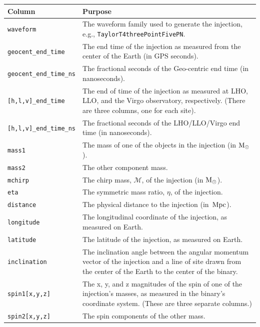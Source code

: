 \begin{table}[p]
\label{tab:sim_inspiral}
\center
\begin{tabular}{l | p{10cm}}
Column      &   Purpose     \\
\hline \hline
\texttt{waveform}    &   The waveform family used to generate the injection, e.g., \texttt{TaylorT4threePointFivePN}. \\
\hline
\texttt{geocent\_end\_time}     &   The end time of the injection as measured from the center of the Earth (in GPS seconds). \\
\hline
\texttt{geocent\_end\_time\_ns}     & The fractional seconds of the Geo-centric end time (in nanoseconds). \\
\hline
\texttt{[h,l,v]\_end\_time}   & The end of time of the injection as measured at \ac{LHO}, \ac{LLO}, and the Virgo observatory, respectively. (There are three columns, one for each site). \\
\hline
\texttt{[h,l,v]\_end\_time\_ns}   & The fractional seconds of the \ac{LHO}/\ac{LLO}/Virgo end time (in nanoseconds). \\
\hline
\texttt{mass1}      & The mass of one of the objects in the injection (in $\mathrm{M_\odot}$). \\
\hline
\texttt{mass2}      & The other component mass. \\
\hline
\texttt{mchirp}     & The chirp mass, $\mathcal{M}$, of the injection (in $\mathrm{M_\odot}$). \\
\hline
\texttt{eta}        & The symmetric mass ratio, $\eta$, of the injection. \\
\hline
\texttt{distance}   & The physical distance to the injection (in $\,\mathrm{Mpc}$). \\
\hline
\texttt{longitude}  & The longitudinal coordinate of the injection, as measured on Earth. \\
\hline
\texttt{latitude}   & The latitude of the injection, as measured on Earth. \\
\hline
\texttt{inclination}   &   The inclination angle between the angular momentum vector of the injection and a line of site drawn from the center of the Earth to the center of the binary. \\
\hline
\texttt{spin1[x,y,z]}   &   The x, y, and z magnitudes of the spin of one of the injection's masses, as measured in the binary's coordinate system. (These are three separate columns.) \\
\hline
\texttt{spin2[x,y,z]}   &   The spin components of the other mass. \\

\end{tabular}
\end{table}
